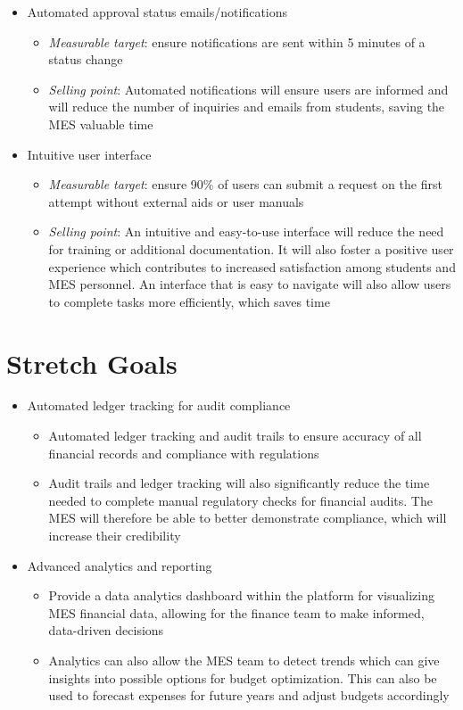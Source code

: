 \documentclass{article}
\begin{document}
\begin{itemize}
\begin{itemize}
    \end{itemize}
    \item Automated approval status emails/notifications
    \begin{itemize}
        \item \emph{Measurable target}: ensure notifications are sent within 5 minutes of a status change
        \item \emph{Selling point}: Automated notifications will ensure users are informed and will reduce the number of inquiries and emails from students, saving the MES valuable time
    \end{itemize}
    \item Intuitive user interface
    \begin{itemize}
        \item \emph{Measurable target}: ensure 90\% of users can submit a request on the first attempt without external aids or user manuals
        \item \emph{Selling point}: An intuitive and easy-to-use interface will reduce the need for training or additional documentation. It will also foster a positive user experience which contributes to increased satisfaction among students and MES personnel. An interface that is easy to navigate will also allow users to complete tasks more efficiently, which saves time
    \end{itemize}
\end{itemize}

\section{Stretch Goals}

\begin{itemize}
    \item Automated ledger tracking for audit compliance
    \begin{itemize}
        \item Automated ledger tracking and audit trails to ensure accuracy of all financial records and compliance with regulations
        \item Audit trails and ledger tracking will also significantly reduce the time needed to complete manual regulatory checks for financial audits. The MES will therefore be able to better demonstrate compliance, which will increase their credibility
    \end{itemize}
    \item Advanced analytics and reporting
    \begin{itemize}
        \item Provide a data analytics dashboard within the platform for visualizing MES financial data, allowing for the finance team to make informed, data-driven decisions 
        \item Analytics can also allow the MES team to detect trends which can give insights into possible options for budget optimization. This can also be used to forecast expenses for future years and adjust budgets accordingly
    \end{itemize}
    \end{itemize}
\end{document}
